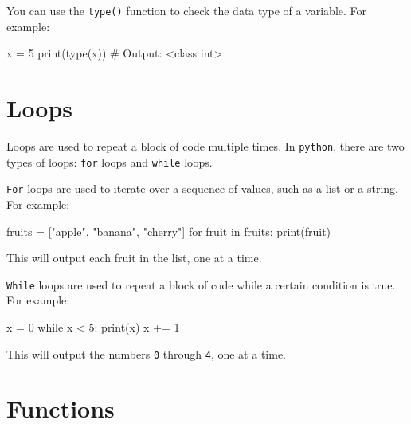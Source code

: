 \documentclass[
  letterpaper,
  DIV=11,
  numbers=noendperiod]{scrreprt}
\newenvironment{Shaded}{\begin{snugshade}}{\end{snugshade}}
\newcommand{\BuiltInTok}[1]{\textcolor[rgb]{0.00,0.23,0.31}{#1}}
\newcommand{\CommentTok}[1]{\textcolor[rgb]{0.37,0.37,0.37}{#1}}
\newcommand{\ControlFlowTok}[1]{\textcolor[rgb]{0.00,0.23,0.31}{#1}}
\newcommand{\DecValTok}[1]{\textcolor[rgb]{0.68,0.00,0.00}{#1}}
\newcommand{\KeywordTok}[1]{\textcolor[rgb]{0.00,0.23,0.31}{#1}}
\newcommand{\NormalTok}[1]{\textcolor[rgb]{0.00,0.23,0.31}{#1}}
\newcommand{\OperatorTok}[1]{\textcolor[rgb]{0.37,0.37,0.37}{#1}}
\newcommand{\StringTok}[1]{\textcolor[rgb]{0.13,0.47,0.30}{#1}}
\begin{document}
You can use the \texttt{type()} function to check the data type of a
variable. For example:

\begin{Shaded}
\begin{Highlighting}[]
\NormalTok{x }\OperatorTok{=} \DecValTok{5}
\BuiltInTok{print}\NormalTok{(}\BuiltInTok{type}\NormalTok{(x)) }\CommentTok{\# Output: \textless{}class \textquotesingle{}int\textquotesingle{}\textgreater{}}
\end{Highlighting}
\end{Shaded}

\hypertarget{loops}{%
\section{Loops}\label{loops}}

Loops are used to repeat a block of code multiple times. In
\texttt{python}, there are two types of loops: \texttt{for} loops and
\texttt{while} loops.

\texttt{For} loops are used to iterate over a sequence of values, such
as a list or a string. For example:

\begin{Shaded}
\begin{Highlighting}[]
\NormalTok{fruits }\OperatorTok{=}\NormalTok{ [}\StringTok{"apple"}\NormalTok{, }\StringTok{"banana"}\NormalTok{, }\StringTok{"cherry"}\NormalTok{]}
\ControlFlowTok{for}\NormalTok{ fruit }\KeywordTok{in}\NormalTok{ fruits:}
  \BuiltInTok{print}\NormalTok{(fruit)}
\end{Highlighting}
\end{Shaded}

This will output each fruit in the list, one at a time.

\texttt{While} loops are used to repeat a block of code while a certain
condition is true. For example:

\begin{Shaded}
\begin{Highlighting}[]
\NormalTok{x }\OperatorTok{=} \DecValTok{0}
\ControlFlowTok{while}\NormalTok{ x }\OperatorTok{\textless{}} \DecValTok{5}\NormalTok{:}
  \BuiltInTok{print}\NormalTok{(x)}
\NormalTok{  x }\OperatorTok{+=} \DecValTok{1}
\end{Highlighting}
\end{Shaded}

This will output the numbers \texttt{0} through \texttt{4}, one at a
time.

\hypertarget{functions}{%
\section{Functions}\label{functions}}
\end{document}
